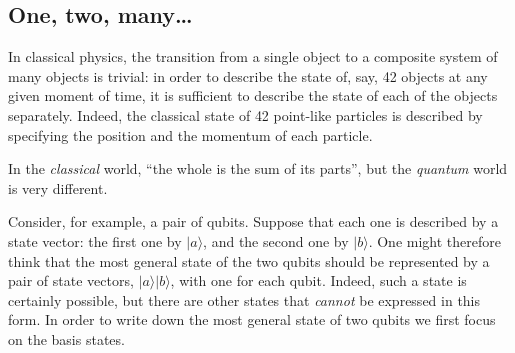 \documentclass[fleqn]{article}
\newenvironment{idea}{\noindent}{\medskip}
\begin{document}
\hypertarget{one-two-many}{%
\subsection{One, two, many\ldots{}}\label{one-two-many}}

In classical physics, the transition from a single object to a composite system of many objects is trivial: in order to describe the state of, say, 42 objects at any given moment of time, it is sufficient to describe the state of each of the objects separately.
Indeed, the classical state of 42 point-like particles is described by specifying the position and the momentum of each particle.

\begin{idea}

In the \emph{classical} world, ``the whole is the sum of its parts'', but the \emph{quantum} world is very different.

\end{idea}

Consider, for example, a pair of qubits.
Suppose that each one is described by a state vector: the first one by \(|a\rangle\), and the second one by \(|b\rangle\).
One might therefore think that the most general state of the two qubits should be represented by a pair of state vectors, \(|a\rangle|b\rangle\), with one for each qubit.
Indeed, such a state is certainly possible, but there are other states that \emph{cannot} be expressed in this form.
In order to write down the most general state of two qubits we first focus on the basis states.
\end{document}
